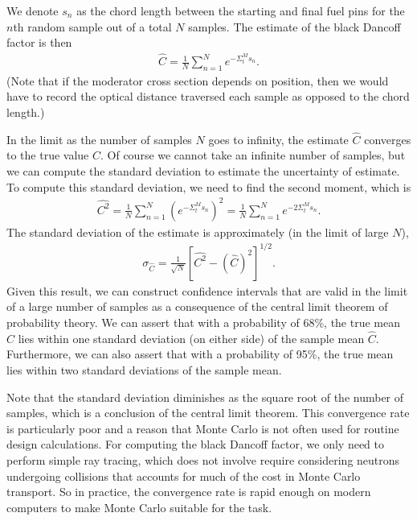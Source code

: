 We denote $s_n$ as the chord length between the starting and final fuel pins for the $n$th random sample out of a total $N$ samples. The estimate of the black Dancoff factor is then
\begin{align}
  \widehat{C} = \frac{1}{N} \sum_{n=1}^N e^{-\Sigma_t^M s_n} .
\end{align}
(Note that if the moderator cross section depends on position, then we would have to record the optical distance traversed each sample as opposed to the chord length.)

In the limit as the number of samples $N$ goes to infinity, the estimate $\widehat{C}$ converges to the true value $C$. Of course we cannot take an infinite number of samples, but we can compute the standard deviation to estimate the uncertainty of estimate. To compute this standard deviation, we need to find the second moment, which is
\begin{align}
  \widehat{C^2} = \frac{1}{N} \sum_{n=1}^N \left( e^{-\Sigma_t^M s_n} \right)^2 = \frac{1}{N} \sum_{n=1}^N e^{-2 \Sigma_t^M s_n} .
\end{align}
The standard deviation of the estimate is approximately (in the limit of large $N$),
\begin{align}
  \sigma_{\widehat{C}} = \frac{1}{\sqrt{N}} \left[ \widehat{C^2} - \left( \widehat{C} \right)^2 \right]^{1/2} .
\end{align}
Given this result, we can construct confidence intervals that are valid in the limit of a large number of samples as a consequence of the central limit theorem of probability theory. We can assert that with a probability of 68\%, the true mean $C$ lies within one standard deviation (on either side) of the sample mean $\widehat{C}$. Furthermore, we can also assert that with a probability of 95\%, the true mean lies within two standard deviations of the sample mean.

Note that the standard deviation diminishes as the square root of the number of samples, which is a conclusion of the central limit theorem. This convergence rate is particularly poor and a reason that Monte Carlo is not often used for routine design calculations. For computing the black Dancoff factor, we only need to perform simple ray tracing, which does not involve require considering neutrons undergoing collisions that accounts for much of the cost in Monte Carlo transport. So in practice, the convergence rate is rapid enough on modern computers to make Monte Carlo suitable for the task.



